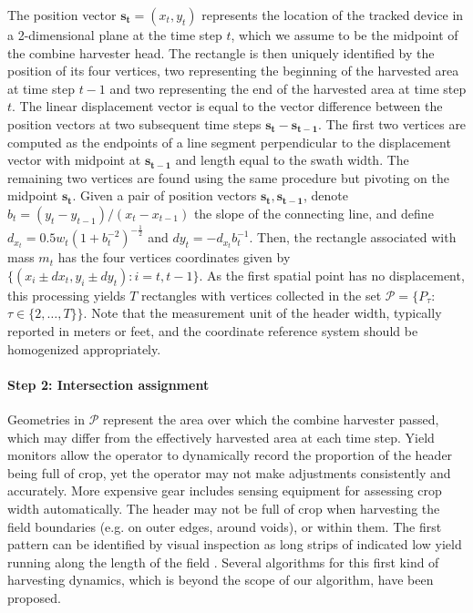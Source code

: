 The position vector $\mathbf{s_t} = (x_{t}, y_{t})$ represents the
location of the tracked device in a 2-dimensional plane at the time
step $t$, which we assume to be the midpoint of the combine harvester
head. The rectangle is then uniquely identified by the position of its
four vertices, two representing the beginning of the harvested area at
time step $t-1$ and two representing the end of the harvested area at
time step $t$. The linear displacement vector is equal to the vector
difference between the position vectors at two subsequent time steps
$\mathbf{s_t} - \mathbf{s_{t-1}}$. The first two vertices are computed
as the endpoints of a line segment perpendicular to the displacement
vector with midpoint at $\mathbf{s_{t-1}}$ and length equal to the
swath width. The remaining two vertices are found using the same
procedure but pivoting on the midpoint $\mathbf{s_t}$. Given a pair of
position vectors $\mathbf{s_t}, \mathbf{s_{t-1}}$, denote
$b_t = (y_t - y_{t-1}) / (x_t - x_{t-1})$ the slope of the connecting
line, and define $d_{x_t} = 0.5 w_t (1 + b_t^{-2})^{-\frac{1}{2}}$ and
$dy_t = - d_{x_t} b_t^{-1}$. Then, the rectangle associated with mass
$m_t$ has the four vertices coordinates given by
$\{(x_{i} \pm dx_t, y_{i} \pm dy_t): i = t, t-1\}$. As the first
spatial point has no displacement, this processing yields $T$
rectangles with vertices collected in the set
$\mathcal{P} = \{P_{\tau}$: $\tau \in \{2, \dots, T\}\}$. Note that
the measurement unit of the header width, typically reported in meters
or feet, and the coordinate reference system should be homogenized
appropriately.

\paragraph{Step 2: Intersection assignment}

 Geometries in $\mathcal{P}$ represent the
area over which the combine harvester passed, which may differ from
the effectively harvested area at each time step. Yield monitors allow
the operator to dynamically record the proportion of the header being
full of crop, yet the operator may not make adjustments consistently
and accurately. More expensive gear includes sensing equipment for
assessing crop width automatically. The header may not be full of crop
when harvesting the field boundaries (e.g. on outer edges, around
voids), or within them. The first pattern can be identified by visual
inspection as long strips of indicated low yield running along the
length of the field \cite{Blackmore1999}. Several algorithms for this
first kind of harvesting dynamics, which is beyond the scope of our
algorithm, have been proposed.


